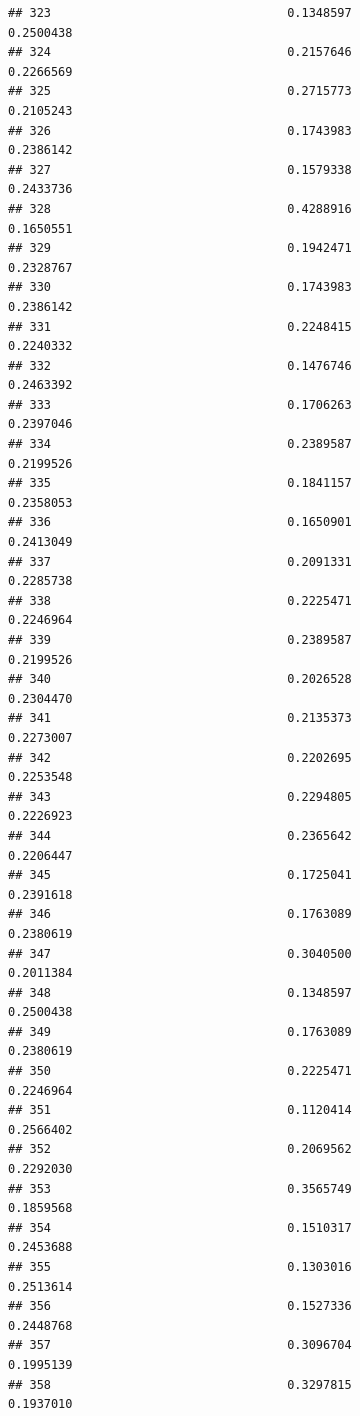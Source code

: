 \documentclass[
  american,
  man,floatsintext]{apa7}
\begin{document}
\begin{verbatim}
## 323                                 0.1348597               0.2500438
## 324                                 0.2157646               0.2266569
## 325                                 0.2715773               0.2105243
## 326                                 0.1743983               0.2386142
## 327                                 0.1579338               0.2433736
## 328                                 0.4288916               0.1650551
## 329                                 0.1942471               0.2328767
## 330                                 0.1743983               0.2386142
## 331                                 0.2248415               0.2240332
## 332                                 0.1476746               0.2463392
## 333                                 0.1706263               0.2397046
## 334                                 0.2389587               0.2199526
## 335                                 0.1841157               0.2358053
## 336                                 0.1650901               0.2413049
## 337                                 0.2091331               0.2285738
## 338                                 0.2225471               0.2246964
## 339                                 0.2389587               0.2199526
## 340                                 0.2026528               0.2304470
## 341                                 0.2135373               0.2273007
## 342                                 0.2202695               0.2253548
## 343                                 0.2294805               0.2226923
## 344                                 0.2365642               0.2206447
## 345                                 0.1725041               0.2391618
## 346                                 0.1763089               0.2380619
## 347                                 0.3040500               0.2011384
## 348                                 0.1348597               0.2500438
## 349                                 0.1763089               0.2380619
## 350                                 0.2225471               0.2246964
## 351                                 0.1120414               0.2566402
## 352                                 0.2069562               0.2292030
## 353                                 0.3565749               0.1859568
## 354                                 0.1510317               0.2453688
## 355                                 0.1303016               0.2513614
## 356                                 0.1527336               0.2448768
## 357                                 0.3096704               0.1995139
## 358                                 0.3297815               0.1937010

\end{verbatim}
\end{document}
